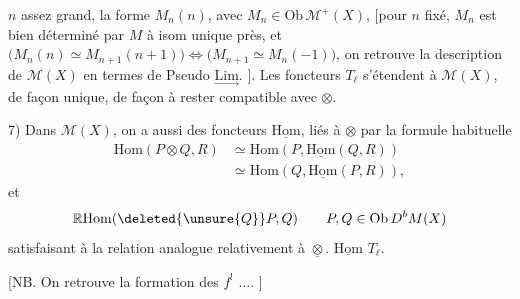 $n$ assez grand,  la forme %
$M_n(n)$, avec $M_n\in\mathrm{Ob}\,\mathcal M^+(X)$, [pour $n$ fixé, %
$M_n$ est bien déterminé par $M$ à isom unique %
près, et $\bigl(M_n(n)\simeq M_{n+1}(n+1)\bigr)\Leftrightarrow\bigl(M_{n+1}\simeq M_n(-1)\bigr)$, %
on retrouve la description de $\mathcal M(X)$ en %
termes de Pseudo $\underset{\longrightarrow}{\mathrm{Lim}}$. ]. Les foncteurs %
$T_\ell$ s'étendent à $\mathcal M(X)$, de façon  unique, de façon %
à rester compatible avec $\otimes$. %

7) Dans $\mathcal M(X)$, on a aussi des foncteurs %
$\underline{\mathrm{Hom}}$, liés à $\otimes$ par la formule %
habituelle %
\[
\begin{aligned}
\mathrm{Hom}(P\otimes Q,R)&\simeq\mathrm{Hom}(P,\underline{\mathrm{Hom}}(Q,R))\\ %
&\simeq\mathrm{Hom}(Q,\underline{\mathrm{Hom}}(P,R)), %
\end{aligned}
\]
et   %
\[
\mathbb R\mathrm{Hom}(\deleted{\unsure{Q}}P,Q)\qquad P,Q\in\mathrm{Ob}\,D^bM(X) %
\]
satisfaisant à la relation analogue %
relativement à $\underline{\otimes}$.  %
$\underline{\mathrm{Hom}}$   $T_\ell$. %

 [NB. On retrouve la formation %
des $f^!$ .... ] %


